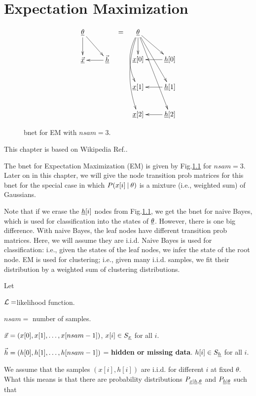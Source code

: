 \chapter{Expectation Maximization}

\begin{figure}[h!]
\centering
$$\begin{array}{ccc}
\xymatrix{
\ul{\theta}\ar[d]\ar[dr]
\\
\ul{\vecx}&\ul{\vech}\ar[l]
}
&=&
\xymatrix{
\ul{\theta}
\ar[d]
\ar@/_1pc/[dd]
\ar@/_1pc/[ddd]
\ar[rd]\ar[rdd]\ar[rddd]
\\
\rvx[0]
&\rvh[0]\ar[l]
\\
\rvx[1]
&\rvh[1]\ar[l]
\\
\rvx[2]
&\rvh[2]\ar[l]
}
\end{array}
$$
\caption{bnet for EM with $nsam=3$.}
\label{fig-em-bnet}
\end{figure}

This chapter is based on Wikipedia 
Ref.\cite{wiki-em}.

The bnet for Expectation
Maximization (EM)
is given by Fig.\ref{fig-em-bnet}
for $nsam=3$.
Later on in this chapter,
we will give the node transition prob matrices
for this bnet for
the special
case in which $P(x[i]{\:\mathbf{|}\:} \theta)$
is a mixture (i.e., weighted sum)
of Gaussians.

Note that if we 
erase the ${\underline{h}}[i]$ nodes
from Fig.\ref{fig-em-bnet},
we get the bnet for naive Bayes,
which is used for classification
into the states of $\underline{\theta}$.
However, there is one big
difference. 
With naive Bayes,
the leaf nodes have
different transition prob matrices.
Here, we will assume they are i.i.d.
Naive Bayes is used for classification: i.e., 
given the states 
of the leaf nodes,
we infer the state of the root node.
EM is used for clustering; i.e.,
given many i.i.d. samples,
we fit their distribution by a weighted sum
of clustering distributions.

Let
 
${\cal L}=$likelihood 
function.

$nsam=$ number of samples.

${\vec{x}}=(x[0], x[1], \ldots, x[nsam-1])$,
 $x[i]\in S_{\underline{x}}$ for all $i$.

${\vec{h}}=(h[0], h[1], \ldots, h[nsam-1])$
= {\bf hidden or missing data}.
$h[i]\in S_{\underline{h}}$ for all $i$.

We assume that the samples $(x[i],h[i])$
are i.i.d. for different $i$ at fixed 
$\theta$.
What this means is that 
there are
probability distributions
$P_{{\underline{x}}|{\underline{h}},\underline{\theta}}$
and $P_{{\underline{h}}|\underline{\theta}}$
such that


